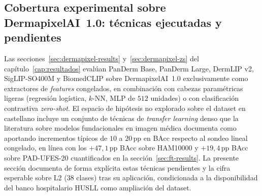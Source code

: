 \subsection{Cobertura experimental sobre DermapixelAI~1.0: técnicas ejecutadas y pendientes}
\label{sec:dermapixel-futuro}

Las secciones~\ref{sec:dermapixel-results}
y~\ref{sec:dermapixel-zs} del capítulo~\ref{cap:resultados} evalúan
PanDerm Base, PanDerm Large, DermLIP v2, SigLIP-SO400M y BiomedCLIP
sobre DermapixelAI~1.0 exclusivamente como extractores de
\emph{features} congelados, en combinación con cabezas paramétricas
ligeras (regresión logística, $k$-NN, MLP de $512$ unidades) o con
clasificación contrastiva \emph{zero-shot}. El espacio de hipótesis
no explorado sobre el dataset en castellano incluye un conjunto de
técnicas de \emph{transfer learning} denso que la literatura sobre
modelos fundacionales en imagen médica documenta como aportando
incrementos típicos de $10$ a $20$\,pp en BAcc respecto al sondeo
lineal congelado, en línea con los $+47{,}1$\,pp BAcc sobre
HAM10000 y $+19{,}4$\,pp BAcc sobre PAD-UFES-20 cuantificados en
la sección~\ref{sec:ft-results}. La presente sección documenta de
forma explícita estas técnicas pendientes y la cifra esperable
sobre L2 (38 clases) tras su aplicación, condicionada a la
disponibilidad del banco hospitalario HUSLL como ampliación del
dataset.

